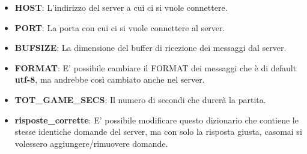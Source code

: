 \begin{itemize}
	\item \textbf{\small HOST}: L'indirizzo del server a cui ci si vuole connettere.
	\item \textbf{\small PORT}: La porta con cui ci si vuole connettere al server.
	\item \textbf{\small BUFSIZE}: La dimensione del buffer di ricezione dei messaggi dal server.
	\item \textbf{\small FORMAT}: E' possibile cambiare il FORMAT dei messaggi che è di default \textbf{utf-8}, ma andrebbe così cambiato anche nel server.
	\item \textbf{\small TOT\_GAME\_SECS}: Il numero di secondi che durerà la partita.
	\item \textbf{\small risposte\_corrette}: E' possibile modificare questo dizionario che contiene le stesse identiche domande del server, ma con solo la risposta giusta, casomai si volessero aggiungere/rimuovere domande.
\end{itemize}



\enlargethispage{1\linewidth}
